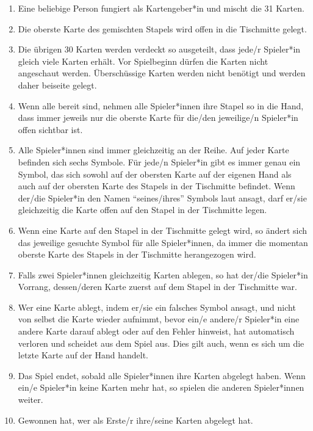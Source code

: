 \documentclass[paper=81mm:81mm]{scrartcl}
\begin{document}
\begin{enumerate}
  \item
  Eine beliebige Person fungiert als Kartengeber*in und mischt die 31 Karten.

  \item
  Die oberste Karte des gemischten Stapels wird offen in die Tischmitte gelegt.

  \item
  Die übrigen 30 Karten werden verdeckt so ausgeteilt,
  dass jede/r Spieler*in gleich viele Karten erhält.
  Vor Spielbeginn dürfen die Karten nicht angeschaut werden.
  Überschüssige Karten werden nicht benötigt und werden daher beiseite gelegt.

  \item
  Wenn alle bereit sind, nehmen alle Spieler*innen ihre Stapel so in die Hand,
  dass immer jeweils nur die oberste Karte für die/den jeweilige/n Spieler*in
  offen sichtbar ist.

  \item
  Alle Spieler*innen sind immer gleichzeitig an der Reihe.
  Auf jeder Karte befinden sich sechs Symbole.
  Für jede/n Spieler*in gibt es immer genau ein Symbol,
  das sich sowohl auf der obersten Karte auf der eigenen Hand
  als auch auf der obersten Karte des Stapels in der Tischmitte befindet.
  Wenn der/die Spieler*in den Namen "`seines/ihres"' Symbols laut ansagt,
  darf er/sie gleichzeitig die Karte offen auf den Stapel in der Tischmitte legen.

  \item
  Wenn eine Karte auf den Stapel in der Tischmitte gelegt wird,
  so ändert sich das jeweilige gesuchte Symbol für alle Spieler*innen,
  da immer die momentan oberste Karte des Stapels in der Tischmitte herangezogen wird.

  \item
  Falls zwei Spieler*innen gleichzeitig Karten ablegen, so hat der/die Spieler*in Vorrang,
  dessen/deren Karte zuerst auf dem Stapel in der Tischmitte war.

  \pagebreak

  \item
  Wer eine Karte ablegt, indem er/sie ein falsches Symbol ansagt,
  und nicht von selbst die Karte wieder aufnimmt,
  bevor ein/e andere/r Spieler*in eine andere Karte darauf ablegt oder auf den Fehler hinweist,
  hat automatisch verloren und scheidet aus dem Spiel aus.
  Dies gilt auch, wenn es sich um die letzte Karte auf der Hand handelt.

  \item
  Das Spiel endet, sobald alle Spieler*innen ihre Karten abgelegt haben.
  Wenn ein/e Spieler*in keine Karten mehr hat, so spielen die anderen Spieler*innen weiter.

  \item
  Gewonnen hat, wer als Erste/r ihre/seine Karten abgelegt hat.
\end{enumerate}
\end{document}
